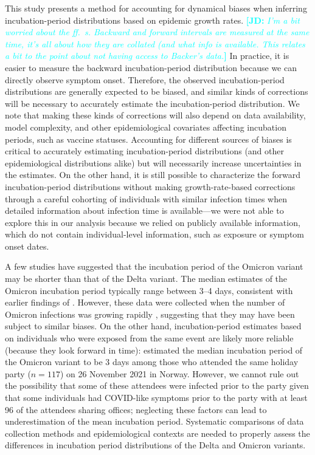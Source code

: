 \documentclass[12pt]{article}
\newcommand{\comment}{\showcomment}
\newcommand{\showcomment}[3]{\textcolor{#1}{\textbf{[#2: }\textsl{#3}\textbf{]}}}
\newcommand{\jd}[1]{\comment{cyan}{JD}{#1}}
\begin{document}
This study presents a method for accounting for dynamical biases when inferring incubation-period distributions based on epidemic growth rates.
\jd{I'm a bit worried about the ff.~s. Backward and forward intervals are measured at the same time, it's all about how they are collated (and what info is available. This relates a bit to the point about not having access to Backer's data.}
In practice, it is easier to measure the backward incubation-period distribution because we can directly observe symptom onset. 
Therefore, the observed incubation-period distributions are generally expected to be biased, and similar kinds of corrections will be necessary to accurately estimate the incubation-period distribution.
We note that making these kinds of corrections will also depend on data availability, model complexity, and other epidemiological covariates affecting incubation periods, such as vaccine statuses. 
Accounting for different sources of biases is critical to accurately estimating incubation-period distributions (and other epidemiological distributions alike) but will necessarily increase uncertainties in the estimates.
On the other hand, it is still possible to characterize the forward incubation-period distributions without making growth-rate-based corrections through a careful cohorting of individuals with similar infection times when detailed information about infection time is available---we were not able to explore this in our analysis because we relied on publicly available information, which do not contain individual-level information, such as exposure or symptom onset dates.

A few studies have suggested that the incubation period of the Omicron variant may be shorter than that of the Delta variant.
The median estimates of the Omicron incubation period typically range between 3--4 days, consistent with earlier findings of \citep{backer2021omicron}. 
However, these data were collected when the number of Omicron infections was growing rapidly \citep{jansen2021investigation,song2022serial}, suggesting that they may have been subject to similar biases.
On the other hand, incubation-period estimates based on individuals who were exposed from the same event are likely more reliable (because they look forward in time):
\cite{brandal2021outbreak} estimated the median incubation period of the Omicron variant to be 3 days among those who attended the same holiday party ($n=117$) on 26 November 2021 in Norway. 
However, we cannot rule out the possibility that some of these attendees were infected prior to the party given that some individuals had COVID-like symptoms prior to the party with at least 96 of the attendees sharing offices; neglecting these factors can lead to underestimation of the mean incubation period.
Systematic comparisons of data collection methods and epidemiological contexts are needed to properly assess the differences in incubation period distributions of the Delta and Omicron variants.
\end{document}
